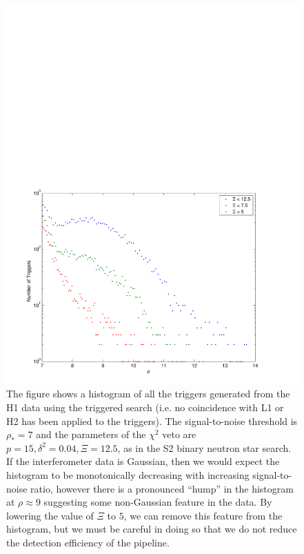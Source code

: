 \begin{figure}[p]
\begin{center}
\includegraphics[width=\textwidth]{figures/result/h1l1_snr_hist_delta_0_04_chisq_12_5}
\end{center}
\caption[Tuning the $\chi^2$ Veto for H1]{%
\label{f:h1_chisq_tuning}%
The figure shows a histogram of all the triggers generated from the H1 data
using the triggered search (i.e. no coincidence with L1 or H2 has been applied
to the triggers). The signal-to-noise threshold is $\rho_\ast = 7$ and the
parameters of the $\chi^2$ veto are $p = 15, \delta^2 = 0.04, \Xi = 12.5$, as
in the S2 binary neutron star search. If the interferometer data is Gaussian,
then we would expect the histogram to be monotonically decreasing with
increasing signal-to-noise ratio, however there is a pronounced ``hump'' in the
histogram at $\rho\approx 9$ suggesting some non-Gaussian feature in the data.
By lowering the value of $\Xi$ to $5$, we can remove this feature from the
histogram, but we must be careful in doing so that we do not reduce the
detection efficiency of the pipeline.
}
\end{figure}

